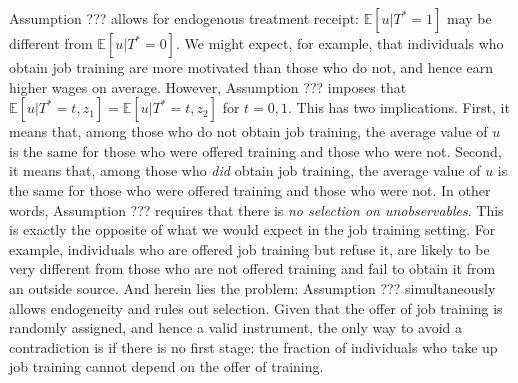 Assumption ??? allows for endogenous treatment receipt: $\mathbb{E}[u|T^*=1]$ may be different from $\mathbb{E}[u|T^*=0]$.
We might expect, for example, that individuals who obtain job training are more motivated than those who do not, and hence earn higher wages on average. 
However, Assumption ??? imposes that $\mathbb{E}\left[u|T^*=t,z_1 \right]=\mathbb{E}\left[ u|T^*=t,z_2 \right]$ for $t=0,1$.
This has two implications.
First, it means that, among those who do not obtain job training, the average value of $u$ is the same for those who were offered training and those who were not.
Second, it means that, among those who \emph{did} obtain job training, the average value of $u$ is the same for those who were offered training and those who were not.
In other words, Assumption ??? requires that there is \emph{no selection on unobservables}.
This is exactly the opposite of what we would expect in the job training setting.
For example, individuals who are offered job training but refuse it, are likely to be very different from those who are not offered training and fail to obtain it from an outside source. 
And herein lies the problem: Assumption ??? simultaneously allows endogeneity and rules out selection.
Given that the offer of job training is randomly assigned, and hence a valid instrument, the only way to avoid a contradiction is if there is no first stage: the fraction of individuals who take up job training cannot depend on the offer of training.
 
